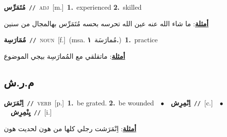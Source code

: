 \documentclass[10pt,a4paper,twoside]{article} %
\begin{document}
\begin{multicols}{2}
{\setlength\topsep{0pt}\textbf{\foreignlanguage{arabic}{مُتَمَرِّس}}\ {\color{gray}\texttt{//}\color{black}}\ \textsc{adj}\ [m.]\ \textbf{1.}~experienced  \textbf{2.}~skilled\  \begin{flushright}\color{gray}\foreignlanguage{arabic}{\textbf{\underline{\foreignlanguage{arabic}{أمثلة}}}: ما شاء الله عنه عين الله تحرسه بحسه مُتَمَرِّس بهالمجال من سنين}\end{flushright}\color{black}} \vspace{2mm}

{\setlength\topsep{0pt}\textbf{\foreignlanguage{arabic}{مُمَارَسِة}}\ {\color{gray}\texttt{//}\color{black}}\ \textsc{noun}\ [f.]\ \color{gray}(msa. \foreignlanguage{arabic}{مُمارَسَة}~\foreignlanguage{arabic}{\textbf{١.}})\color{black}\ \textbf{1.}~practice\  \begin{flushright}\color{gray}\foreignlanguage{arabic}{\textbf{\underline{\foreignlanguage{arabic}{أمثلة}}}: ماتقلقي مع المُمارَسِة بيجي الموضوع}\end{flushright}\color{black}} \vspace{2mm}

\vspace{-3mm}
\subsection*{\color{blue}\foreignlanguage{arabic}{م.ر.ش}\color{blue}{}} 

{\setlength\topsep{0pt}\textbf{\foreignlanguage{arabic}{اِنْمَرَش}}\ {\color{gray}\texttt{//}\color{black}}\ \textsc{verb}\ [p.]\ \textbf{1.}~be grated.  \textbf{2.}~be wounded\ \ $\bullet$\ \ \setlength\topsep{0pt}\textbf{\foreignlanguage{arabic}{اِنْمِرِش}}\ {\color{gray}\texttt{//}\color{black}}\ [c.]\ \ $\bullet$\ \ \setlength\topsep{0pt}\textbf{\foreignlanguage{arabic}{يِنْمِرِش}}\ {\color{gray}\texttt{//}\color{black}}\ [i.]\  \begin{flushright}\color{gray}\foreignlanguage{arabic}{\textbf{\underline{\foreignlanguage{arabic}{أمثلة}}}: اِنْمَرَشت رجلي كلها من هون لحديت هون}\end{flushright}\color{black}} \vspace{2mm}


\end{multicols}
\end{document}
